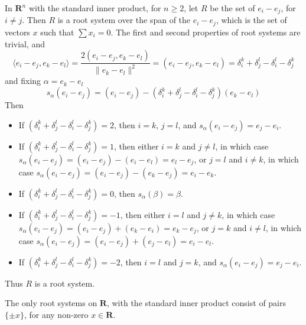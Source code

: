 \begin{example}
    In $\mathbf{R}^n$ with the standard inner product, for $n \geq 2$, let $R$ be the set of $e_i - e_j$, for $i \neq j$. Then $R$ is a root system over the span of the $e_i - e_j$, which is the set of vectors $x$ such that $\sum x_i = 0$. The first and second properties of root systems are trivial, and
    \[ \langle e_i - e_j, e_k - e_l \rangle = \frac{2(e_i - e_j, e_k - e_l)}{\| e_k - e_l \|^2} = (e_i - e_j, e_k - e_l) = \delta_i^k + \delta_j^l - \delta_i^l - \delta_j^k \]
    and fixing $\alpha = e_k - e_l$
    \[ s_\alpha(e_i - e_j) = (e_i - e_j) - (\delta_i^k + \delta_j^l - \delta_i^l - \delta_j^k) (e_k - e_l) \]
    Then
    \begin{itemize}
        \item If $(\delta_i^k + \delta_j^l - \delta_i^l - \delta_j^k) = 2$, then $i = k$, $j = l$, and $s_\alpha(e_i - e_j) = e_j - e_i$.
        \item If $(\delta_i^k + \delta_j^l - \delta_i^l - \delta_j^k) = 1$, then either $i = k$ and $j \neq l$, in which case $s_\alpha(e_i - e_j) = (e_i - e_j) - (e_i - e_l) = e_l - e_j$, or $j = l$ and $i \neq k$, in which case $s_\alpha(e_i - e_j) = (e_i - e_j) - (e_k - e_j) = e_i - e_k$.
        \item If $(\delta_i^k + \delta_j^l - \delta_i^l - \delta_j^k) = 0$, then $s_\alpha(\beta) = \beta$.
        \item If $(\delta_i^k + \delta_j^l - \delta_i^l - \delta_j^k) = -1$, then either $i = l$ and $j \neq k$, in which case $s_\alpha(e_i - e_j) = (e_i - e_j) + (e_k - e_i) = e_k - e_j$, or $j = k$ and $i \neq l$, in which case $s_\alpha(e_i - e_j) = (e_i - e_j) + (e_j - e_l) = e_i - e_l$.
        \item If $(\delta_i^k + \delta_j^l - \delta_i^l - \delta_j^k) = -2$, then $i = l$ and $j = k$, and $s_\alpha(e_i - e_j) = e_j - e_i$.
    \end{itemize}
    Thus $R$ is a root system.
\end{example}

\begin{example}
    The only root systems on $\mathbf{R}$, with the standard inner product consist of pairs $\{ \pm x \}$, for any non-zero $x \in \mathbf{R}$.
\end{example}

